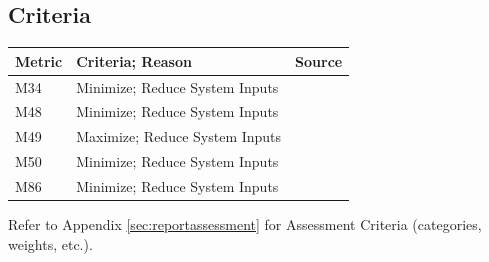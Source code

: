 \documentclass{report}
\begin{document}
\subsection{Criteria}
\begin{center}
    \begin{tabular}{|l|p{12.6cm}|p{1.3cm}|}
        \hline
        \textbf{Metric} & \textbf{Criteria; Reason} & \textbf{Source} \\
        \hline
        M34 & Minimize; Reduce System Inputs & \cite{applicantguide} \\
        \hline
        M48 & Minimize; Reduce System Inputs & \cite{applicantguide} \\
        \hline
        M49 & Maximize; Reduce System Inputs & \cite{applicantguide} \\
        \hline
        M50 & Minimize; Reduce System Inputs & \cite{applicantguide} \\
        \hline
        M86 & Minimize; Reduce System Inputs & \cite{applicantguide} \\
        \hline
    \end{tabular}
\end{center}

Refer to Appendix \ref{sec:reportassessment} for Assessment Criteria (categories, weights, etc.).

\newpage
\end{document}
